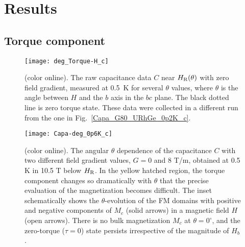 \documentclass[twocolumn, aps, superscriptaddress, amsfonts,floatfix]{revtex4}%
\begin{document}
{%
\section{Results}
\subsection{Torque component}
\begin{figure}[t]
\begin{flushright}
\texttt{[image: deg\_Torque-H\_c]}
\end{flushright}
\caption{(color online).  The raw capacitance data $C$ near $H_{\rm R}(\theta)$ with zero field gradient, measured at 0.5~K for several $\theta$ values, where $\theta$ is the angle between $H$ and the $b$ axis in the $bc$ plane. The black dotted line is zero torque state. These data were collected in a different run from the one in Fig.~\ref{Capa_G80_URhGe_0p2K_c}.
\label{deg_Torque-H_c}}
\end{figure}
\begin{figure}[t]

\begin{flushright}
\texttt{[image: Capa-deg\_0p6K\_c]}
\end{flushright}
\caption{(color online).  The angular $\theta$ dependence of the capacitance $C$ with two different field gradient values, $G = 0$ and 8  T/m, obtained at 0.5 K in 10.5 T below $H_{\rm R}$. In the yellow hatched region, the torque component changes so dramatically with $\theta$ that the precise evaluation of the magnetization becomes difficult. The inset schematically shows the $\theta$-evolution of the FM domains with positive and negative components of $M_c$ (solid arrows) in a magnetic field $H$ (open arrows). There is no bulk magnetization $M_c$ at $\theta=0^\circ$, and the zero-torque ($\tau=0$) state persists irrespective of the magnitude of $H_b$.
\label{Capa-deg_0p6K_c}}
\end{figure}

}
\end{document}
